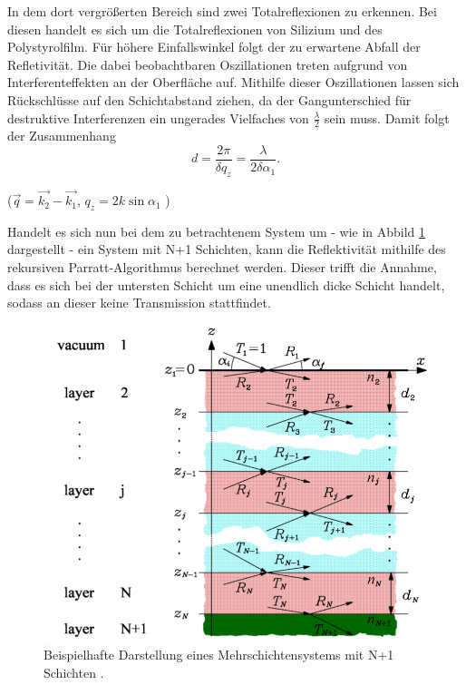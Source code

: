 In dem dort vergrößerten Bereich sind zwei Totalreflexionen zu erkennen. Bei diesen handelt es sich um die Totalreflexionen von Silizium und des Polystyrolfilm. Für höhere Einfallswinkel folgt der zu erwartene Abfall der Refletivität. Die dabei beobachtbaren Oszillationen treten aufgrund von Interferenteffekten an der Oberfläche auf. Mithilfe dieser Oszillationen lassen sich Rückschlüsse auf den Schichtabstand ziehen, da der Gangunterschied für destruktive Interferenzen ein ungerades Vielfaches von $\frac{\lambda}{2}$ sein muss.
Damit folgt der Zusammenhang
\begin{equation*}
    d = \frac{2 \pi}{\delta q_z} = \frac{\lambda}{2\delta \alpha_1} .
\end{equation*}
\begin{center}
   \tiny{ ($\vec{q} = \vec{k_2}-\vec{k_1}$, $ q_z = 2k \sin{\alpha_1} $ ) }
\end{center}
Handelt es sich nun bei dem zu betrachtenem System um - wie in Abbild \ref{fig:layer} dargestellt - ein System mit N+1 Schichten, kann die Reflektivität mithilfe des rekursiven Parratt-Algorithmus berechnet werden. Dieser trifft die Annahme, dass es sich bei der untersten Schicht um eine unendlich dicke Schicht handelt, sodass an dieser keine Transmission stattfindet.

\begin{figure}[H]
    \centering
    \includegraphics[width = 0.8 \textwidth]{content/images/layers.png}
    \caption{Beispielhafte Darstellung eines Mehrschichtensystems mit N+1 Schichten \cite{e1}. }
    \label{fig:layer}
\end{figure}


